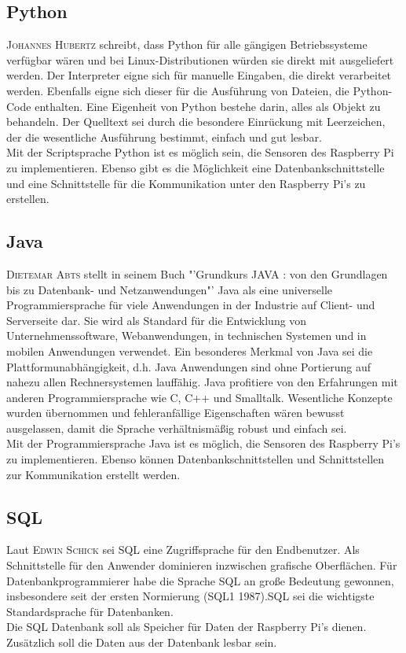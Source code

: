 \subsection{Python}\label{Python}
\textsc{Johannes Hubertz}\cite{hubertz2016softwaretests} schreibt, dass Python für alle gängigen Betriebssysteme verfügbar wären und bei Linux-Distributionen würden sie direkt mit ausgeliefert werden. Der Interpreter eigne sich für manuelle Eingaben, die direkt verarbeitet werden. Ebenfalls eigne sich dieser für die Ausführung von Dateien, die Python-Code enthalten. Eine Eigenheit von Python bestehe darin, alles als Objekt zu behandeln. Der Quelltext sei durch die besondere Einrückung mit Leerzeichen, der die wesentliche Ausführung bestimmt, einfach und gut lesbar. \\
Mit der Scriptsprache Python ist es möglich sein, die Sensoren des Raspberry Pi zu implementieren. Ebenso gibt es die Möglichkeit eine Datenbankschnittstelle und eine Schnittstelle für die Kommunikation unter den Raspberry Pi's zu erstellen.

\subsection{Java}\label{Java}
\textsc{Dietemar Abts} stellt in seinem Buch "'Grundkurs JAVA : von den Grundlagen bis zu Datenbank- und Netzanwendungen"' \cite{abts2015grundkurs} Java als eine universelle Programmiersprache für viele Anwendungen in der Industrie auf Client- und Serverseite dar.
Sie wird als Standard für die Entwicklung von Unternehmenssoftware, Webanwendungen, in technischen Systemen und in mobilen Anwendungen verwendet.
Ein besonderes Merkmal von Java sei die Plattformunabhängigkeit, d.h. Java Anwendungen sind ohne Portierung auf nahezu allen Rechnersystemen lauffähig. Java profitiere von den Erfahrungen mit anderen Programmiersprache wie C, C++ und Smalltalk. Wesentliche Konzepte wurden übernommen und fehleranfällige Eigenschaften wären bewusst ausgelassen, damit die Sprache verhältnismäßig robust und einfach sei.\\
Mit der Programmiersprache Java ist es möglich, die Sensoren des Raspberry Pi's zu implementieren. Ebenso können Datenbankschnittstellen und Schnittstellen zur Kommunikation erstellt werden.

\subsection{\ac{SQL}}
Laut \textsc{Edwin Schick}\cite{schicker2017datenbanken} sei \ac{SQL} eine Zugriffsprache für den Endbenutzer. Als Schnittstelle für den Anwender dominieren inzwischen grafische Oberflächen. Für Datenbankprogrammierer habe die Sprache \ac{SQL} an große Bedeutung gewonnen, insbesondere seit der ersten Normierung (SQL1 1987).\ac{SQL} sei die wichtigste Standardsprache für Datenbanken. \\
Die \ac{SQL} Datenbank soll als Speicher für Daten der Raspberry Pi's dienen. Zusätzlich soll die Daten aus der Datenbank lesbar sein.

